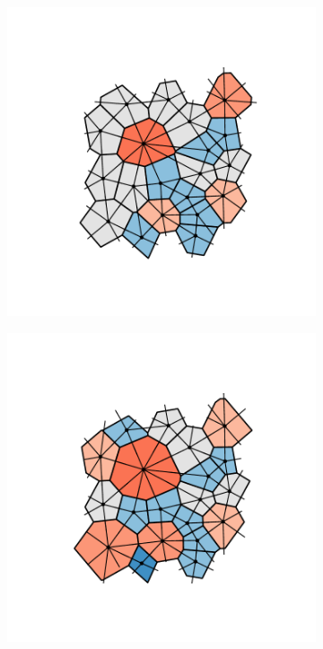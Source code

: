 \begin{figure}[b]
\begin{subfigure}[b]{0.22\textwidth}
         \caption{}
         \label{fig:vorodemor1}
     \end{subfigure}
     \hfill
     \begin{subfigure}[b]{0.22\textwidth}
         \centering
         \includegraphics[width=\textwidth]{./figures/methods/voro_demo_vcd.pdf}
         \caption{}
         \label{fig:vorodemov2}
     \end{subfigure}
     \hfill
       \begin{subfigure}[b]{0.22\textwidth}
         \centering
         \includegraphics[width=\textwidth]{./figures/methods/voro_demo_rcd.pdf}
         \caption{}
         \label{fig:vorodemor2}
     \end{subfigure}
   

\end{figure}

